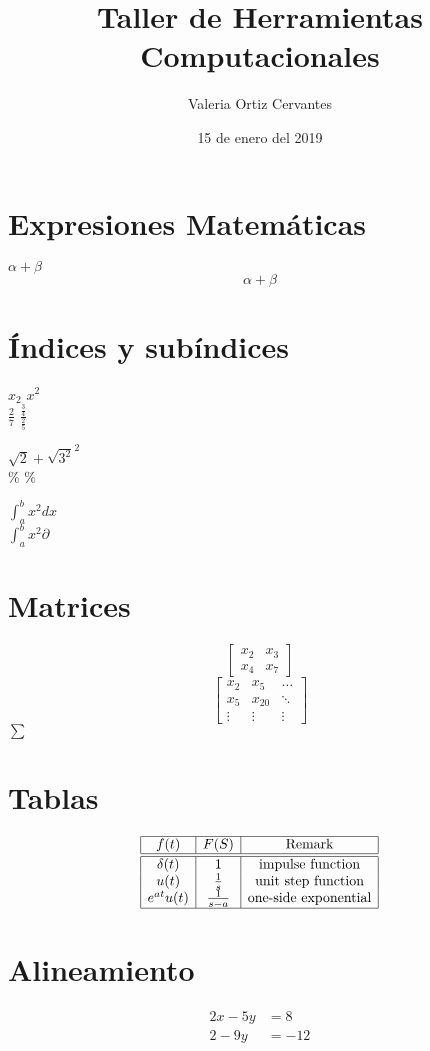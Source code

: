 \documentclass{article}
\title{\Huge Taller de Herramientas Computacionales}
\author{Valeria Ortiz Cervantes}
\date{15 de enero del 2019}
\begin{document}
	\maketitle
\newpage
\section*{Expresiones Matemáticas}
$\alpha +  \beta$\\ %
\[\alpha + \beta\] %
\section*{Índices y subíndices}
$x_{2}$ %
$x^{2}$ \\ %

$\frac{2}{7}$ %
$\frac{\frac{3}{4}}{\frac{2}{5}}$

$\sqrt{2} + \sqrt{3^2}^2$ \\
\%   $\%$

$\int_{a}^{b} x^2 dx$ \\ 
$\int_{a}^{b} x^2 \partial$
\section*{Matrices}
\[
\begin{bmatrix}
	x_{2} & x_{3}\\
	x_{4} & x_{7}
\end{bmatrix}
\]
\[ %
\begin{bmatrix}
x_{2} & x_{5} & \dots\\
x_{5} & x_{20} & \ddots\\
\vdots & \vdots & \vdots
\end{bmatrix}
\]
$\sum$

\section*{Tablas}
\[
\begin{array}{|c|c|c|}
\hline
f(t) & F(S) & \mbox{Remark}\\
\hline \hline
\delta(t) & 1 & \mbox{impulse function}\\
u(t) & \frac{1}{s} & \mbox{unit step function}\\
e^{at}u(t) & \frac{1}{s-a} & \mbox{one-side exponential}\\
\hline
\end{array}
\]

\section*{Alineamiento}
\begin{align*}
	2x - 5y &= 8 \\
	2 - 9y &= -12
\end{align*}
\end{document}
